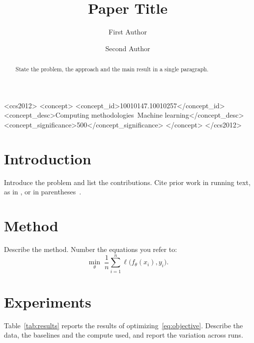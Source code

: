 \documentclass[acmsmall,review,anonymous]{acmart}
\begin{document}
\title{Paper Title}

\author{First Author}

\author{Second Author}

\begin{abstract}
State the problem, the approach and the main result in a single
paragraph.
\end{abstract}

\begin{CCSXML}
<ccs2012>
  <concept>
    <concept_id>10010147.10010257</concept_id>
    <concept_desc>Computing methodologies~Machine learning</concept_desc>
    <concept_significance>500</concept_significance>
  </concept>
</ccs2012>
\end{CCSXML}



\maketitle

\section{Introduction}
Introduce the problem and list the contributions. Cite prior work in
running text, as in \citet{knuth1984texbook}, or in
parentheses~\citep{lamport1994latex}.

\section{Method}
Describe the method. Number the equations you refer to:
\begin{equation}
  \label{eq:objective}
  \min_{\theta} \; \frac{1}{n} \sum_{i=1}^{n} \ell\bigl(f_\theta(x_i), y_i\bigr) .
\end{equation}

\section{Experiments}
Table~\ref{tab:results} reports the results of
optimizing~\eqref{eq:objective}. Describe the data, the baselines and the
compute used, and report the variation across runs.
\end{document}
